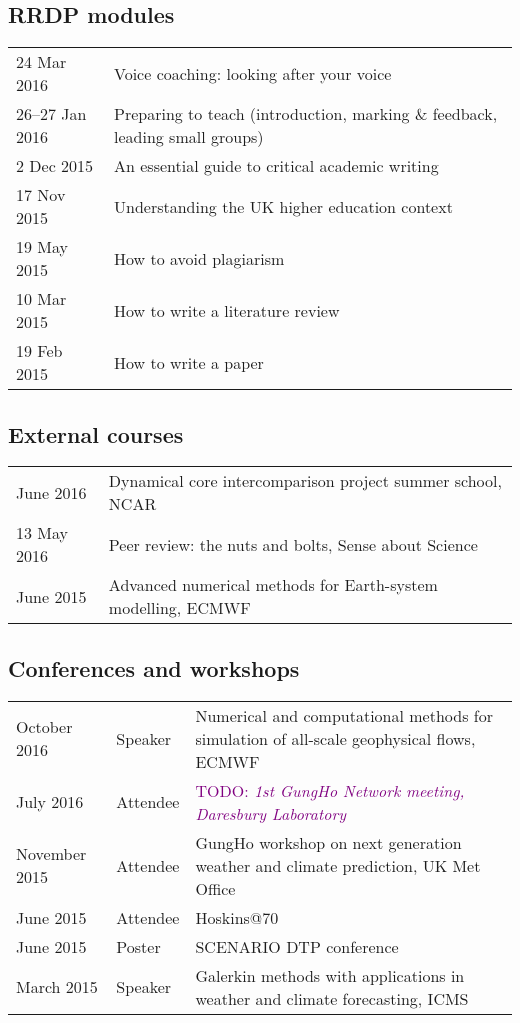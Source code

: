 \documentclass[a4paper,11pt]{article}
\newcommand{\TODO}[1]{\textcolor{purple}{TODO: \emph{#1}}}
\begin{document}
\subsection*{RRDP modules}
\begin{tabular}{l l}
24 Mar 2016	& Voice coaching: looking after your voice \\
26--27 Jan 2016 & Preparing to teach (introduction, marking \& feedback, leading small groups) \\
2 Dec 2015	& An essential guide to critical academic writing \\
17 Nov 2015	& Understanding the UK higher education context \\
19 May 2015	& How to avoid plagiarism \\
10 Mar 2015	& How to write a literature review \\
19 Feb 2015	& How to write a paper \\
\end{tabular}

\subsection*{External courses}
\begin{tabular}{l l}
June 2016 & Dynamical core intercomparison project summer school, NCAR \\
13 May 2016 & Peer review: the nuts and bolts, Sense about Science \\
June 2015 & Advanced numerical methods for Earth-system modelling, ECMWF \\
\end{tabular}

\subsection*{Conferences and workshops}
\begin{tabularx}{\linewidth}{l l X}
October 2016 & Speaker & Numerical and computational methods for simulation of all-scale geophysical flows, ECMWF \\
July 2016 & Attendee & \TODO{1st GungHo Network meeting, Daresbury Laboratory} \\
November 2015 & Attendee & GungHo workshop on next generation weather and climate prediction, UK Met Office \\
June 2015 & Attendee & Hoskins@70 \\
June 2015 & Poster & SCENARIO DTP conference \\
March 2015 & Speaker & Galerkin methods with applications in weather and climate forecasting, ICMS \\
\end{tabularx}
\end{document}
